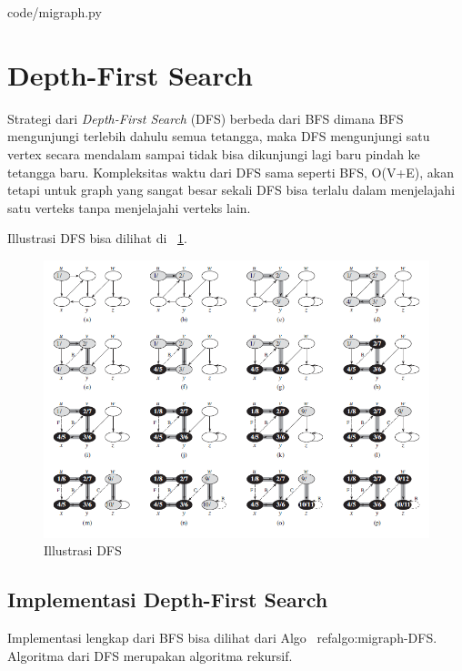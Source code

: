 
                {code/migraph.py}
								
\section{Depth-First Search}

Strategi dari \textit{Depth-First Search} (DFS) berbeda dari BFS dimana BFS mengunjungi terlebih dahulu semua tetangga, maka DFS mengunjungi satu vertex secara mendalam sampai tidak bisa dikunjungi lagi baru pindah ke tetangga baru. Kompleksitas waktu dari DFS sama seperti BFS, O(V+E), akan tetapi untuk graph yang sangat besar sekali DFS bisa terlalu dalam menjelajahi satu verteks tanpa menjelajahi verteks lain.

Illustrasi DFS bisa dilihat di ~\ref{fig:Dfs}.

\begin{figure}
    \includegraphics[width=\textwidth,keepaspectratio]{fig/DFS.png}%
	\caption{Illustrasi DFS}%
	\label{fig:Dfs}%
\end{figure}


\subsection{Implementasi Depth-First Search}

Implementasi lengkap dari BFS bisa dilihat dari Algo ~ref{algo:migraph-DFS}. Algoritma dari DFS merupakan algoritma rekursif.

